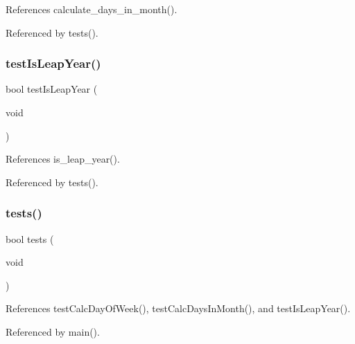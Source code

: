 References calculate\+\_\+days\+\_\+in\+\_\+month().



Referenced by tests().

\mbox{\label{tests_8h_a4b7126dd5f2bce3c1215754b4431dedc}} 
\subsubsection{test\+Is\+Leap\+Year()}
{\footnotesize\ttfamily bool test\+Is\+Leap\+Year (\begin{DoxyParamCaption}\item[{void}]{ }\end{DoxyParamCaption})}



References is\+\_\+leap\+\_\+year().



Referenced by tests().

\mbox{\label{tests_8h_a5e6e6e78df62797046c9ea173550a68a}} 
\subsubsection{tests()}
{\footnotesize\ttfamily bool tests (\begin{DoxyParamCaption}\item[{void}]{ }\end{DoxyParamCaption})}



References test\+Calc\+Day\+Of\+Week(), test\+Calc\+Days\+In\+Month(), and test\+Is\+Leap\+Year().



Referenced by main().

